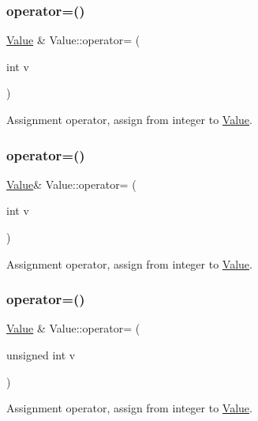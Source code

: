 \subsubsection{\texorpdfstring{operator=()}{operator=()}\hspace{0.1cm}{\footnotesize\ttfamily [7/32]}}
{\footnotesize\ttfamily \hyperlink{classValue}{Value} \& Value\+::operator= (\begin{DoxyParamCaption}\item[{int}]{v }\end{DoxyParamCaption})}

Assignment operator, assign from integer to \hyperlink{classValue}{Value}. \mbox{\label{classValue_ad335f85d7bbebb5b730b8745de9d7ed5}} 
\subsubsection{\texorpdfstring{operator=()}{operator=()}\hspace{0.1cm}{\footnotesize\ttfamily [8/32]}}
{\footnotesize\ttfamily \hyperlink{classValue}{Value}\& Value\+::operator= (\begin{DoxyParamCaption}\item[{int}]{v }\end{DoxyParamCaption})}

Assignment operator, assign from integer to \hyperlink{classValue}{Value}. \mbox{\label{classValue_ac1948d494a3331392c329177680d648d}} 
\subsubsection{\texorpdfstring{operator=()}{operator=()}\hspace{0.1cm}{\footnotesize\ttfamily [9/32]}}
{\footnotesize\ttfamily \hyperlink{classValue}{Value} \& Value\+::operator= (\begin{DoxyParamCaption}\item[{unsigned int}]{v }\end{DoxyParamCaption})}

Assignment operator, assign from integer to \hyperlink{classValue}{Value}. \mbox{\label{classValue_a25d05fbb6ebed1bde0eaccd65d3370ad}} 
